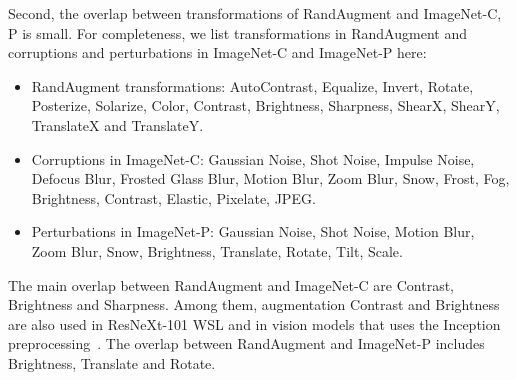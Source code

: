 \documentclass[10pt,twocolumn,letterpaper]{article}
\begin{document}
Second, the overlap between transformations of RandAugment and ImageNet-C, P is small. For completeness, we list transformations in RandAugment and corruptions and perturbations in ImageNet-C and ImageNet-P here:
\begin{itemize}
    \item RandAugment transformations: AutoContrast, Equalize, Invert, Rotate, Posterize, Solarize, Color, Contrast, Brightness, Sharpness, ShearX, ShearY, TranslateX and TranslateY.
    \item Corruptions in ImageNet-C: Gaussian Noise, Shot Noise, Impulse Noise, Defocus Blur, Frosted Glass Blur, Motion Blur, Zoom Blur, Snow, Frost, Fog, Brightness, Contrast, Elastic, Pixelate, JPEG.
    \item Perturbations in ImageNet-P: Gaussian Noise, Shot Noise, Motion Blur, Zoom Blur, Snow, Brightness, Translate, Rotate, Tilt, Scale.
\end{itemize} 

The main overlap between RandAugment and ImageNet-C are Contrast, Brightness and Sharpness. 
Among them, augmentation Contrast and Brightness are also used in ResNeXt-101 WSL \cite{mahajan2018exploring} and in vision models that uses the Inception preprocessing~\cite{howard2013some,szegedy2015going}. 
The overlap between RandAugment and ImageNet-P includes Brightness, Translate and Rotate. 
\end{document}
